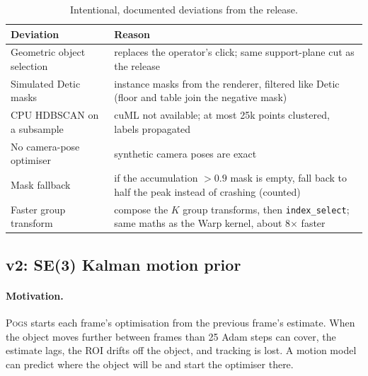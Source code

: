 \documentclass[10pt,a4paper]{article}
\newcommand{\pogs}{\textsc{Pogs}}
\begin{document}
\begin{table}[t]
\centering\small
\caption{Intentional, documented deviations from the release.}
\label{tab:deviations}
\begin{tabularx}{\linewidth}{l X}
\toprule
Deviation & Reason \\
\midrule
Geometric object selection & replaces the operator's click; same support-plane cut as the release \\
Simulated Detic masks & instance masks from the renderer, filtered like Detic (floor and table join the negative mask) \\
CPU HDBSCAN on a subsample & cuML not available; at most 25k points clustered, labels propagated \\
No camera-pose optimiser & synthetic camera poses are exact \\
Mask fallback & if the accumulation $>0.9$ mask is empty, fall back to half the peak instead of crashing (counted) \\
Faster group transform & compose the $K$ group transforms, then \texttt{index\_select}; same maths as the Warp kernel, about 8$\times$ faster \\
\bottomrule
\end{tabularx}
\end{table}

\subsection{v2: SE(3) Kalman motion prior}
\label{sec:v2}

\paragraph{Motivation.} \pogs{} starts each frame's optimisation from the previous
frame's estimate. When the object moves further between frames than 25 Adam steps
can cover, the estimate lags, the ROI drifts off the object, and tracking is lost.
A motion model can predict where the object will be and start the optimiser there.
\end{document}
